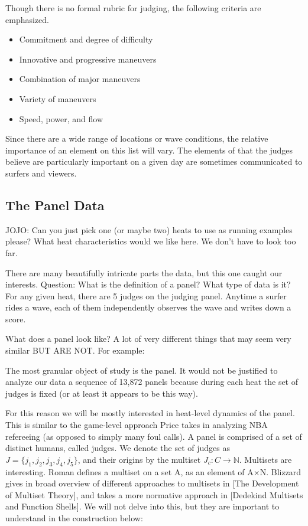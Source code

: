 \documentclass{article}
\theoremstyle{definition}
\begin{document}
Though there is no formal rubric for judging, the following criteria are emphasized.
\begin{itemize}
\item Commitment and degree of difficulty
\item Innovative and progressive maneuvers
\item Combination of major maneuvers
\item Variety of maneuvers
\item Speed, power, and flow
\end{itemize}
Since there are a wide range of locations or wave conditions, the relative importance of an element on this list will vary. The elements of that the judges believe are particularly important on a given day are sometimes communicated to surfers and viewers.

\subsection{The Panel Data}


JOJO: Can you just pick one (or maybe two) heats to use as running examples please? What heat characteristics would we like here. We don't have to look too far.

There are many beautifully intricate parts the data, but this one caught our interests.
Question: What is the definition of a panel? What type of data is it?
For any given heat, there are 5 judges on the judging panel. Anytime a surfer rides a wave, each of them independently observes the wave and writes down a score. 

What does a panel look like? A lot of very different things that may seem very similar BUT ARE NOT. For example:

The most granular object of study is the panel. It would not be justified to analyze our data a sequence of 13,872 panels because during each heat the set of judges is fixed (or at least it appears to be this way).

For this reason we will be mostly interested in heat-level dynamics of the panel. This is similar to the game-level approach Price takes in analyzing NBA refereeing (as opposed to simply many foul calls). A panel is comprised of a set of distinct humans, called judges. We denote the set of judges as $J=\{j_1, j_2, j_3,j_4, j_5\}$, and their origins by the multiset $J_c:C\rightarrow\mathbb{N}$. Multisets are interesting. Roman defines a multiset on a set A, as an element of A×N. Blizzard gives in broad overview of different approaches to multisets in [The Development of Multiset Theory], and takes a more normative approach in [Dedekind Multisets and Function Shells]. We will not delve into this, but they are important to understand in the construction below:
\end{document}
